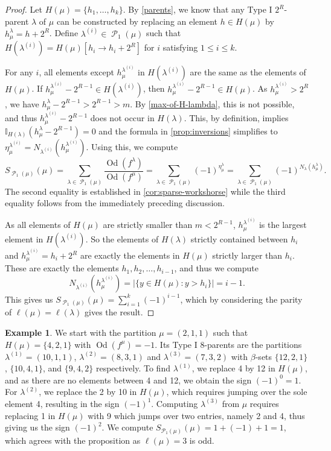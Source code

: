 \documentclass[12pt]{amsart}
\theoremstyle{definition}
\newtheorem{example}[theorem]{Example}
\numberwithin{equation}{section}
\newcommand{\la}{\lambda}
\DeclareMathOperator{\p}{\mathcal{P}}
\DeclareMathOperator{\Od}{Od}
\begin{document}
\begin{proof}
Let $H(\mu) = \{h_1, \ldots, h_k\}$. By \cref{parents}, we know that any Type I $2^R$-parent $\la$ of $\mu$ can be constructed by replacing an element $h\in H(\mu)$ by $h^\la_\mu= h+2^R$. Define $\lambda^{(i)} \in \p_1(\mu)$ such that $H(\lambda^{(i)}) = H(\mu)[h_i\to h_i + 2^R]$ for $i$ satisfying $1\leq i \leq k$.

For any $i$, all elements except $h^{\lambda^{(i)}}_\mu$ in $H(\la^{(i)})$ are the same as the elements of $H(\mu)$. If $h^{\la^{(i)}}_\mu - 2^{R-1} \in H(\la^{(i)})$, then $h^{\la^{(i)}}_\mu - 2^{R-1} \in H(\mu)$. As $h^{\la^{(i)}}_\mu > 2^R$, we have $h^{\lambda}_\mu - 2^{R-1} > 2^{R-1} > m$. By \cref{max-of-H-lambda}, this is not possible, and thus $h^{\la^{(i)}}_\mu - 2^{R-1}$ does not occur in $H(\la)$. This, by definition, implies $\mathbb{I}_{H(\lambda)}(h^\lambda_\mu - 2^{R-1}) = 0$ and the formula in \cref{prop:inversions} simplifies to $\eta^{\la^{(i)}}_\mu = N_{\la^{(i)}}(h^{\la^{(i)}}_\mu)$.
Using this, we compute \[
S_{\p_1(\mu)}(\mu) =  \sum\limits_{\lambda\in \p_1(\mu)} \frac{\Od(f^\lambda)}{\Od(f^\mu)}
= \sum\limits_{\lambda\in \p_1(\mu)}(-1)^{\eta^\lambda_\mu}
= \sum\limits_{\lambda\in \p_1(\mu)}(-1)^{N_{\lambda}(h^\lambda_\mu)}.\]
The second equality is established in \cref{cor:sparse-workshorse} while the third equality follows from the immediately preceding discussion.

As all elements of $H(\mu)$ are strictly smaller than $m < 2^{R-1}$, $h^{\lambda^{(i)}}_\mu$ is the largest element in $H(\lambda^{(i)})$. So the elements of $H(\lambda)$ strictly contained between $h_i$ and $h^{\lambda^{(i)}}_\mu = h_i + 2^R$ are exactly the elements in $H(\mu)$ strictly larger than $h_i$. These are exactly the elements $h_1, h_2, \ldots, h_{i-1}$, and thus we compute
\[
N_{\lambda^{(i)}}(h^{\lambda^{(i)}}_\mu)  
=|\{y\in H(\mu): y > h_i\}|= i - 1.\]
This gives us $
S_{\p_1(\mu)}(\mu) = \sum\limits_{i=1}^k (-1)^{i-1}$, which by considering the parity of $\ell(\mu) = \ell(\lambda)$ gives the result.
\end{proof}
\begin{example}
We start with the partition $\mu = (2,1,1)$ such that $H(\mu) = \{4,2,1\}$ with $\Od(f^\mu) = -1$. Its Type I $8$-parents are the partitions $\lambda^{(1)} = (10,1,1)$, $\lambda^{(2)} = (8,3,1)$ and $\lambda^{(3)} = (7,3,2)$ with $\beta$-sets $\{12,2,1\}$, $\{10,4,1\}$, and $\{9,4,2\}$ respectively. To find $\la^{(1)}$, we replace 4 by 12 in $H(\mu)$, and as there are no elements between 4 and 12, we obtain the sign $(-1)^0 = 1$. For $\la^{(2)}$, we replace the 2 by 10 in $H(\mu)$, which requires jumping over the sole element 4, resulting in the sign $(-1)^1$. Computing $\la^{(3)}$ from $\mu$ requires replacing 1 in $H(\mu)$ with 9 which jumps over two entries, namely 2 and 4, thus giving us the sign $(-1)^2$. We compute $S_{\mathcal{P}_1(\mu)}(\mu) = 1 + (-1) + 1 = 1$, which agrees with the proposition as $\ell(\mu) = 3$ is odd.
\end{example}
\end{document}

